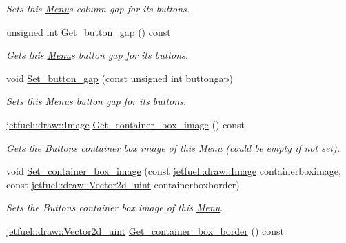 \begin{DoxyCompactItemize}
\begin{DoxyCompactList}\small\item\em Sets this \hyperlink{classjetfuel_1_1gui_1_1Menu}{Menu}\textquotesingle{}s column gap for it\textquotesingle{}s buttons. \end{DoxyCompactList}\item 
unsigned int \hyperlink{classjetfuel_1_1gui_1_1Menu_a6ce40fbb47e1d6f6602092a4f4520bee}{Get\+\_\+button\+\_\+gap} () const
\begin{DoxyCompactList}\small\item\em Gets this \hyperlink{classjetfuel_1_1gui_1_1Menu}{Menu}\textquotesingle{}s button gap for it\textquotesingle{}s buttons. \end{DoxyCompactList}\item 
void \hyperlink{classjetfuel_1_1gui_1_1Menu_a8b715d2e92f18b77eb78e7a8e4fc8208}{Set\+\_\+button\+\_\+gap} (const unsigned int buttongap)
\begin{DoxyCompactList}\small\item\em Sets this \hyperlink{classjetfuel_1_1gui_1_1Menu}{Menu}\textquotesingle{}s button gap for it\textquotesingle{}s buttons. \end{DoxyCompactList}\item 
\hyperlink{classjetfuel_1_1draw_1_1Image}{jetfuel\+::draw\+::\+Image} \hyperlink{classjetfuel_1_1gui_1_1Menu_a6657e617308d99482c12f544fb88173c}{Get\+\_\+container\+\_\+box\+\_\+image} () const
\begin{DoxyCompactList}\small\item\em Gets the Buttons\textquotesingle{} container box image of this \hyperlink{classjetfuel_1_1gui_1_1Menu}{Menu} (could be empty if not set). \end{DoxyCompactList}\item 
void \hyperlink{classjetfuel_1_1gui_1_1Menu_a3ddedd81c865929157751c7857716318}{Set\+\_\+container\+\_\+box\+\_\+image} (const \hyperlink{classjetfuel_1_1draw_1_1Image}{jetfuel\+::draw\+::\+Image} containerboximage, const \hyperlink{classjetfuel_1_1draw_1_1Vector2d}{jetfuel\+::draw\+::\+Vector2d\+\_\+uint} containerboxborder)
\begin{DoxyCompactList}\small\item\em Sets the Buttons\textquotesingle{} container box image of this \hyperlink{classjetfuel_1_1gui_1_1Menu}{Menu}. \end{DoxyCompactList}\item 
\hyperlink{classjetfuel_1_1draw_1_1Vector2d}{jetfuel\+::draw\+::\+Vector2d\+\_\+uint} \hyperlink{classjetfuel_1_1gui_1_1Menu_aa8dbb384542c547ff90cdfeea1ff07eb}{Get\+\_\+container\+\_\+box\+\_\+border} () const

\end{DoxyCompactItemize}
